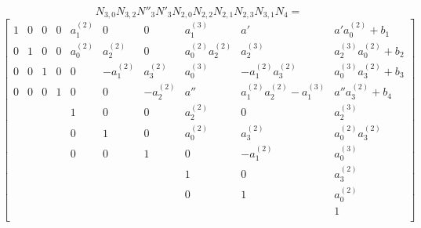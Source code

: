\documentclass{article}
\begin{document}
\[
N_{3,0}N_{3,2}N''_3N'_3N_{2,0}N_{2,2}N_{2,1}N_{2,3}N_{3,1}N_{4}=\]\[
  \begin{bmatrix}
    1 & 0 & 0 & 0 & a_1^{(2)} & 0 & 0 & a_1^{(3)} & a' & a'a_0^{(2)}+b_{1} \\
    0 & 1 & 0 & 0 & a_0^{(2)} & a_2^{(2)} & 0 & a_0^{(2)}a_2^{(2)} & a_2^{(3)} & a_2^{(3)}a_0^{(2)}+b_{2} \\
    0 & 0 & 1 & 0 & 0 & -a_1^{(2)} & a_3^{(2)} & a_0^{(3)} & -a_1^{(2)}a_3^{(2)} & a_0^{(3)}a_3^{(2)}+b_{3} \\
    0 & 0 & 0 & 1 & 0 & 0 & -a_2^{(2)} & a'' & a_1^{(2)}a_2^{(2)}-a_1^{(3)} & a''a_3^{(2)}+b_{4} \\
    & & & & 1 & 0 & 0 & a_2^{(2)} & 0 & a_2^{(3)} \\
    & & & & 0 & 1 & 0 & a_0^{(2)} & a_3^{(2)} & a_0^{(2)}a_3^{(2)}\\
    & & & & 0 & 0 & 1 & 0 & -a_1^{(2)} & a_0^{(3)} \\
    & & & & & & & 1 & 0 & a_3^{(2)} \\
    & & & & & & & 0 & 1 & a_0^{(2)} \\
    & & & & & & & & & 1 \\
  \end{bmatrix}
\]
\end{document}
